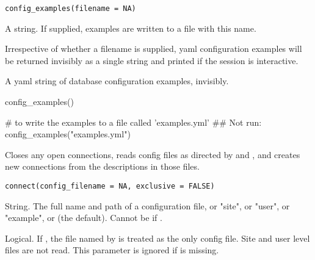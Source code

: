 \documentclass[a4paper]{book}
\begin{document}
%
\begin{Usage}
\begin{verbatim}
config_examples(filename = NA)
\end{verbatim}
\end{Usage}
%
\begin{Arguments}
\begin{ldescription}
\item[\code{filename}] A string. If supplied, examples are written to a file with this name.
\end{ldescription}
\end{Arguments}
%
\begin{Details}\relax
Irrespective of whether a filename is supplied, yaml configuration examples
will be returned invisibly as a single string and printed if the session is
interactive.
\end{Details}
%
\begin{Value}
A yaml string of database configuration examples, invisibly.
\end{Value}
%
\begin{Examples}
\begin{ExampleCode}
config_examples()

# to write the examples to a file called 'examples.yml'
## Not run:  config_examples("examples.yml")

\end{ExampleCode}
\end{Examples}
%
\begin{Description}\relax
Closes any open connections, reads config files as directed by
 and , and creates new connections from the
descriptions in those files.
\end{Description}
%
\begin{Usage}
\begin{verbatim}
connect(config_filename = NA, exclusive = FALSE)
\end{verbatim}
\end{Usage}
%
\begin{Arguments}
\begin{ldescription}
\item[\code{config\_filename}] String. The full name and path of a configuration
file, or "site", or "user", or "example", or  (the default). Cannot be
 if .

\item[\code{exclusive}] Logical. If , the file named by  is
treated as the only config file. Site and user level files are not read.
This parameter is ignored if  is missing.
\end{ldescription}
\end{Arguments}
\end{document}
